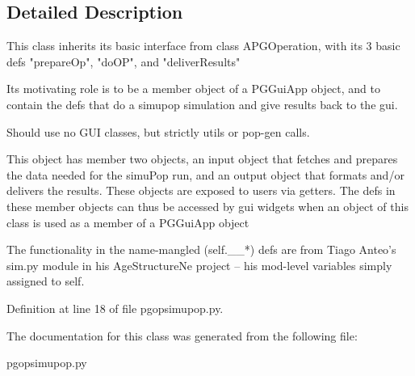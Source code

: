 \subsection{Detailed Description}
\begin{DoxyVerb}This class inherits its basic interface from class APGOperation, with its 3
basic defs "prepareOp", "doOP", and "deliverResults"

Its motivating role is to be a member object of a PGGuiApp object, and to contain the
defs that do a simupop simulation and give results back to the gui.

Should use no GUI classes, but strictly utils or pop-gen calls.

This object has member two objects, an input object that fetches and prepares the
data needed for the simuPop run, and an output object that formats and/or delivers
the results.   These objects are exposed to users via getters.  The defs in these 
member objects can thus be accessed by gui widgets when an object of this class  
is used as a member of a PGGuiApp object

The functionality in the name-mangled (self.__*) defs are from Tiago Anteo's sim.py module in 
his AgeStructureNe project -- his mod-level variables simply assigned to self.
\end{DoxyVerb}
 

Definition at line 18 of file pgopsimupop.\+py.



The documentation for this class was generated from the following file\+:\begin{DoxyCompactItemize}
\item 
pgopsimupop.\+py\end{DoxyCompactItemize}
